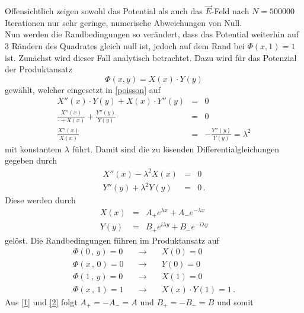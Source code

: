 Offensichtlich zeigen sowohl das Potential als auch das $\vec{E}$-Feld nach $N=500000$ Iterationen nur sehr geringe, numerische Abweichungen von Null.\\
Nun werden die Randbedingungen so verändert, dass das Potential weiterhin auf $3$ Rändern des Quadrates gleich null ist, jedoch auf dem Rand bei $\Phi\left(x,1\right)=1$ ist. Zunächst wird dieser Fall analytisch betrachtet. Dazu wird für das Potenzial der Produktansatz 
\begin{equation}
\Phi\left(x,y\right)=X\left(x\right)\cdot Y\left(y\right)
\end{equation}
gewählt, welcher eingesetzt in \eqref{poisson} auf 
\begin{eqnarray}
X''\left(x\right)\cdot Y\left(y\right)+X\left(x\right)\cdot Y''\left(y\right)&=&0
\\
\frac{X''\left(x\right)}{\cdot +X\left(x\right)}+\frac{Y''\left(y\right)}{Y\left(y\right)}
&=&0
\\
\frac{X''\left(x\right)}{X\left(x\right)}
&=&
-\frac{Y''\left(y\right)}{Y\left(y\right)}=\lambda^2
\end{eqnarray}
mit konstantem $\lambda$ führt. Damit sind die zu lösenden Differentialgleichungen gegeben durch
\begin{eqnarray}
X''\left(x\right)-\lambda^2 X\left(x\right)&=&0
\\
Y''\left(y\right)+\lambda^2 Y\left(y\right)&=&0\,.
\end{eqnarray}
Diese werden durch 
\begin{eqnarray}
 X\left(x\right)&=&A_+ e^{\lambda x} +A_- e^{-\lambda x}
 \\
  Y\left(y\right)&=&B_+ e^{i\lambda y} +B_- e^{-i\lambda y} 
\end{eqnarray}
gelöst. Die Randbedingungen führen im Produktansatz auf 
\begin{subequations}
\begin{eqnarray}
\label{1}
\Phi\left(0\,,\,y\right)=0\quad&\rightarrow&\quad X\left(0\right)=0
\\\label{2}
\Phi\left(x\,,\,0\right)=0\quad&\rightarrow&\quad Y\left(0\right)=0
\\\label{3}
\Phi\left(1\,,\,y\right)=0\quad&\rightarrow&\quad X\left(1\right)=0
\\\label{4}
\Phi\left(x\,,\,1\right)=1\quad&\rightarrow&\quad X\left(x\right)
\cdot Y\left(1\right)=1\,.
\end{eqnarray}
\end{subequations}
Aus \ref{1} und \ref{2} folgt $A_+=-A_-=A$ und $B_+=-B_-=B$ und somit 
